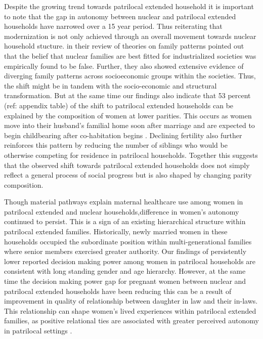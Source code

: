 \documentclass[12pt]{article}
\begin{document}
Despite the growing trend towards patrilocal extended household it is important to note that the gap in autonomy between nuclear and patrilocal extended households have narrowed over a 15 year period. Thus reiterating that modernization is not only achieved through an overall movement towards nuclear household stucture. \cite{pesando2019rethinking} in their review of \cite{goode1963world} theories on family patterns pointed out that the belief that nuclear families are best fitted for industrialized societies was empirically found to be false. Further, they also showed extensive evidence of diverging family patterns across socioeconomic groups within the societies. Thus, the shift might be in tandem with the socio-economic and structural transformation.  But at the same time our findings also indicate that 53 percent (ref: appendix table) of the shift to patrilocal extended households can be explained by the composition of women at lower parities. This occurs as women move into their husband’s familial home soon after marriage \cite{breton2021modernisation} and are expected to begin childbearing after co-habitation begins \cite{ibarra2020desire}. Declining fertility also further reinforces this pattern by reducing the number of siblings who would be otherwise competing for residence in patrilocal households. Together this suggests that the observed shift towards patrilocal extended households does not simply reflect a general process of social progress but is also shaped by changing parity composition.  

Though material pathways explain maternal healthcare use among women in patrilocal extended and nuclear households,difference in women's autonomy continued to persist. This is a sign of an existing hierarchical structure within patrilocal extended families. Historically, newly married women in these households occupied the subordinate position within multi-generational families where senior members exercised greater authority. Our findings of persistently lower reported decision making power among women in patrilocal households are consistent with long standing gender and age hierarchy. However, at the same time the decision making power gap for pregnant women between nuclear and patrilocal extended households have been reducing this can be a result of improvement in quality of relationship between daughter in law and their in-laws. This relationship can shape women’s lived experiences within patrilocal extended families, as positive relational ties are associated with greater perceived autonomy in patrilocal settings \cite{char2010influence}.  
\end{document}
